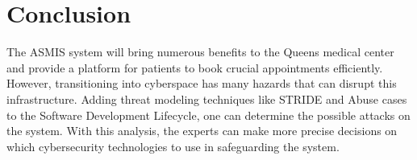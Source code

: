 \chapter{Conclusion}
The ASMIS system will bring numerous benefits to the Queens medical center and provide a platform for patients to book crucial appointments efficiently. However, transitioning into cyberspace has many hazards that can disrupt this infrastructure. Adding threat modeling techniques like STRIDE and Abuse cases to the Software Development Lifecycle, one can determine the possible attacks on the system. With this analysis, the experts can make more precise decisions on which cybersecurity technologies to use in safeguarding the system.
